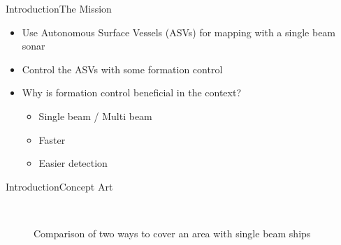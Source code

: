 \documentclass[10pt,handout]{beamer}
\begin{document}
\begin{frame}{Introduction}{The Mission}
\begin{itemize}
\item Use Autonomous Surface Vessels (ASVs) for mapping with a single beam sonar
\item Control the ASVs with some formation control
\item Why is formation control beneficial in the context?
\begin{itemize}
\item Single beam / Multi beam
\item Faster
\item Easier detection
\end{itemize}
\end{itemize}
\end{frame}

\begin{frame}{Introduction}{Concept Art}
\begin{figure}
  \centering
  \ %
  \caption{Comparison of two ways to cover an area with single beam ships}
  \label{fig:concept-art}
\end{figure}
\end{frame}
\end{document}
